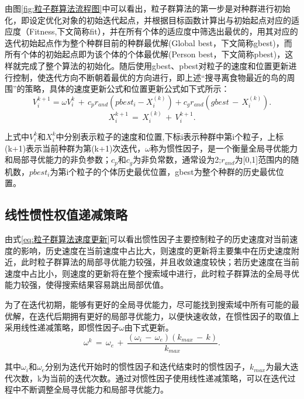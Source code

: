 由图\ref{fig:粒子群算法流程图}中可以看出，粒子群算法的第一步是对种群进行初始化，即设定优化对象的初始迭代起点，并根据目标函数计算出与初始起点对应的适应度（Fitness,下文简称fit），并在所有个体的适应度中筛选出最优的，用其对应的迭代初始起点作为整个种群目前的种群最优解(Global best，下文简称gbest)，而所有个体的初始起点即为该个体的个体最优解(Person best，下文简称pbest)，这样就完成了整个算法的初始化。随后使用gbest、pbest对粒子的速度和位置更新进行控制，使迭代方向不断朝着最优的方向进行，即上述“搜寻离食物最近的鸟的周围”的策略，具体的速度更新公式和位置更新公式如下式所示：
\begin{equation}\label{eq:粒子群算法速度更新}
  V^{k+1}_i=\omega V^{k}_i\,+\,c_pr_{and}(pbest_i-X^{(k)}_i)+c_gr_{and}(gbest\,-\,X^{(k)}_i).
\end{equation}
\begin{equation}\label{eq:粒子群算法位置新}
    X^{k+1}_i\,=\,X^{(k)}_i\,+\,V_i^{k+1}.
\end{equation}

上式中\(V^{k}_i\)和\( X^{k}_i\)中分别表示粒子的速度和位置,下标i表示种群中第i个粒子，上标(k+1)表示当前种群为第(k+1)次迭代，\(\omega\)称为惯性因子，是一个衡量全局寻优能力和局部寻优能力的非负参数；\(c_p\)和\(c_g\)为非负常数，通常设为2;\(r_{and}\)为[0,1]范围内的随机数，\(pbest_i\)为第i个粒子的个体历史最优位置，gbest为整个种群的历史最优位置。

\subsection{线性惯性权值递减策略}
由式\eqref{eq:粒子群算法速度更新}可以看出惯性因子主要控制粒子的历史速度对当前速度的影响，历史速度在当前速度中占比大，则速度的更新将主要集中在历史速度附近，此时粒子群算法的局部寻优能力较强，并且收敛速度较快；若历史速度在当前速度中占比小，则速度的更新将在整个搜索域中进行，此时粒子群算法的全局寻优能力较强，使得搜索结果容易跳出局部优值。

为了在迭代初期，能够有更好的全局寻优能力，尽可能找到搜索域中所有可能的最优解，在迭代后期拥有更好的局部寻优能力，以便快速收敛，在惯性因子的取值上采用线性递减策略\cite{冯浩2015一种改进的粒子群优化算法惯性权值递减策略}，即惯性因子\(\omega\)由下式更新。
\begin{equation}\label{eq:omega更新公式}
  \omega^k\,=\,\omega_e\,+\,\frac{(\omega_i\,-\,\omega_e)(k_{max}\,-\,k)}{k_{max}}.
  \end{equation}

其中\(\omega_i\)和\(\omega_e\)分别为迭代开始时的惯性因子和迭代结束时的惯性因子，\(k_{max}\)为最大迭代次数，k为当前的迭代次数。通过对惯性因子使用线性递减策略，可以在迭代过程中不断调整全局寻优能力和局部寻优能力。

